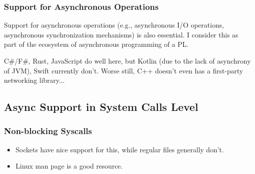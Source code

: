 \documentclass{article}
\begin{document}
\subsubsection{Support for Asynchronous Operations}

Support for asynchronous operations (e.g., asynchronous I/O operations, asynchronous synchronization mechanisms) is also essential.
I consider this as part of the ecosystem of asynchronous programming of a PL.

C\#/F\#, Rust, JavaScript do well here, but Kotlin (due to the lack of asynchrony of JVM), Swift currently don't.
Worse still, C++ doesn't even has a first-party networking library...

\subsection{Async Support in System Calls Level}

\subsubsection{Non-blocking Syscalls}
\begin{itemize}
    \item Sockets have nice support for this, while regular files generally don't.
    \item Linux man page is a good resource.
\end{itemize}
\end{document}
